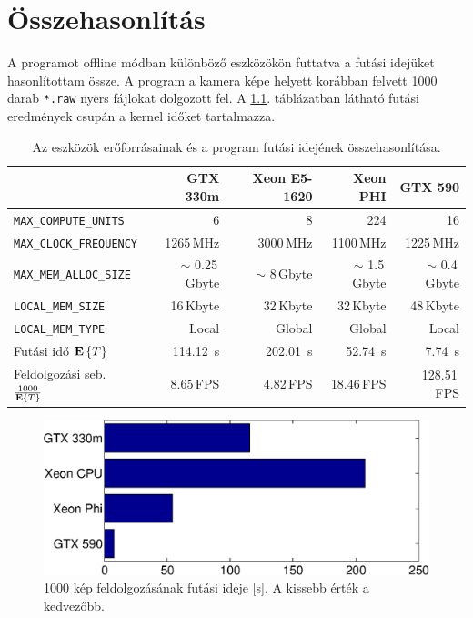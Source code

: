 \chapter{Összehasonlítás}

	A programot offline módban különböző eszközökön futtatva a futási idejüket hasonlítottam össze.
	A program a kamera képe helyett korábban felvett 1000 darab \texttt{*.raw} nyers fájlokat dolgozott fel.
	A \ref{table:results}. táblázatban látható futási eredmények csupán a kernel időket tartalmazza.
	
	\begin{table}[H]
	\footnotesize
	\centering
	
	\setlength{\extrarowheight}{3.5pt}
	\begin{tabular}{ l | r | r | r | r}
		 & GTX 330m & Xeon E5-1620 & Xeon PHI & GTX 590\\ \hline
		\texttt{MAX\_COMPUTE\_UNITS} & 6 & 8 & 224 & 16\\
		\texttt{MAX\_CLOCK\_FREQUENCY} & 1265\,MHz & 3000\,MHz & 1100\,MHz & 1225\,MHz\\
		\texttt{MAX\_MEM\_ALLOC\_SIZE} & $\sim$ 0.25\,Gbyte & $\sim$ 8\,Gbyte & $\sim$ 1.5\,Gbyte & $\sim$ 0.4\,Gbyte\\
		\texttt{LOCAL\_MEM\_SIZE} & 16\,Kbyte & 32\,Kbyte & 32\,Kbyte & 48\,Kbyte\\
		\texttt{LOCAL\_MEM\_TYPE} & Local & Global & Global & Local\\\hline
		Futási idő ${\mathop{\bf E\/}\left\{T\right\}}$ & 114.12~s & 202.01~s & 52.74~s & 7.74~s\\
		Feldolgozási seb. $\frac{1000}{{\mathop{\bf E\/}\left\{T\right\}}}$ & 8.65\,FPS & 4.82\,FPS & 18.46\,FPS & 128.51\,FPS
	\end{tabular}
	
	\caption[Az eszközök erőforrásainak és a program futási idejének összehasonlítása.]{Az eszközök erőforrásainak és a program
	futási idejének összehasonlítása.}
	\label{table:results}
	\end{table}
	
	\begin{figure}[!h]
	\begin{center}
	  \includegraphics[width=0.9\columnwidth]{figures/eps/runtime.eps}
	  \caption[1000 kép feldolgozásának futási ideje.]{1000 kép feldolgozásának futási ideje [s]. A kissebb érték a kedvezőbb.}
	  \label{fig:runtime}
	\end{center}
	\end{figure}
	
